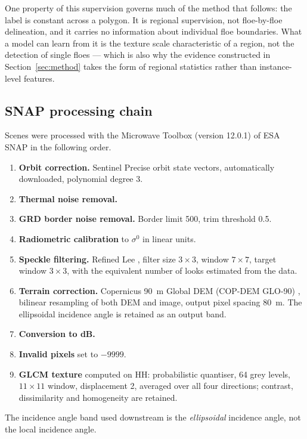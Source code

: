 \documentclass[preprint,12pt,authoryear]{elsarticle}
\begin{document}
One property of this supervision governs much of the method that follows: the
label is constant across a polygon. It is regional supervision, not
floe-by-floe delineation, and it carries no information about individual floe
boundaries. What a model can learn from it is the texture scale characteristic
of a region, not the detection of single floes --- which is also why the
evidence constructed in Section~\ref{sec:method} takes the form of regional
statistics rather than instance-level features.

\subsection{SNAP processing chain}

Scenes were processed with the Microwave Toolbox (version 12.0.1) of ESA SNAP
\citep{esa2025snap} in the following order.
\begin{enumerate}
\item \textbf{Orbit correction.} Sentinel Precise orbit state vectors,
      automatically downloaded, polynomial degree 3.
\item \textbf{Thermal noise removal.}
\item \textbf{GRD border noise removal.} Border limit 500, trim threshold 0.5.
\item \textbf{Radiometric calibration} to $\sigma^0$ in linear units.
\item \textbf{Speckle filtering.} Refined Lee \citep{lee1981refined}, filter
      size $3\times3$, window $7\times7$, target window $3\times3$, with the
      equivalent number of looks estimated from the data.
\item \textbf{Terrain correction.} Copernicus 90~m Global DEM (COP-DEM GLO-90)
      \citep{opentopography2021copdem}, bilinear resampling of both DEM and
      image, output pixel spacing 80~m. The ellipsoidal incidence angle is
      retained as an output band.
\item \textbf{Conversion to dB.}
\item \textbf{Invalid pixels} set to $-9999$.
\item \textbf{GLCM texture} \citep{haralick1973textural} computed on HH:
      probabilistic quantiser, 64 grey levels, $11\times11$ window,
      displacement 2, averaged over all four directions; contrast,
      dissimilarity and homogeneity are retained.
\end{enumerate}
The incidence angle band used downstream is the \emph{ellipsoidal} incidence
angle, not the local incidence angle.
\end{document}
